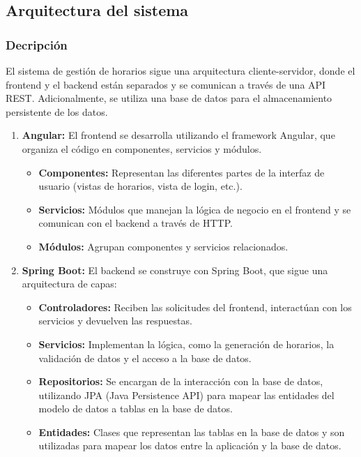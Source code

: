 \documentclass{article} %
\begin{document}
    \subsection{Arquitectura del sistema}
    \subsubsection{Decripción}
    \noindent El sistema de gestión de horarios sigue una arquitectura cliente-servidor, donde el frontend y el backend están separados y se comunican a través de una API REST. Adicionalmente, se utiliza una base de datos para el almacenamiento persistente de los datos.
    
    \begin{enumerate}[font=\bfseries]
            \item \textbf{Angular:} El frontend se desarrolla utilizando el framework Angular, que organiza el código en componentes, servicios y módulos.            
            \begin{itemize}
                \item \textbf{Componentes:} Representan las diferentes partes de la interfaz de usuario (vistas de horarios, vista de login, etc.).
                \item \textbf{Servicios:} Módulos que manejan la lógica de negocio en el frontend y se comunican con el backend a través de HTTP.
                \item \textbf{Módulos:} Agrupan componentes y servicios relacionados.
            \end{itemize}
        
            \item \textbf{Spring Boot:} El backend se construye con Spring Boot, que sigue una arquitectura de capas:
            \begin{itemize}
                \item \textbf{Controladores:} Reciben las solicitudes del frontend, interactúan con los servicios y devuelven las respuestas.
                \item \textbf{Servicios:} Implementan la lógica, como la generación de horarios, la validación de datos y el acceso a la base de datos.
                \item \textbf{Repositorios:} Se encargan de la interacción con la base de datos, utilizando JPA (Java Persistence API) para mapear las entidades del modelo de datos a tablas en la base de datos.
                \item \textbf{Entidades:} Clases que representan las tablas en la base de datos y son utilizadas para mapear los datos entre la aplicación y la base de datos.
            \end{itemize}
        

\end{enumerate}
\end{document}
